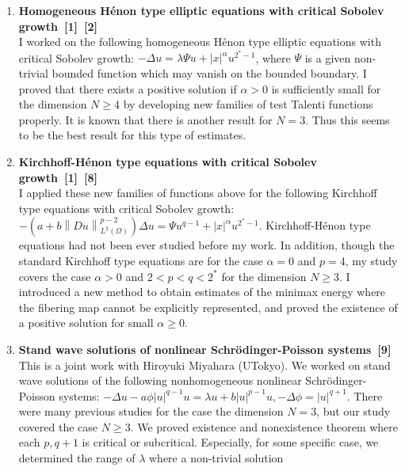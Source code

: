 
\begin{enumerate}
  \item {\bf Homogeneous H\'enon type elliptic equations with critical Sobolev growth~[1]~[2]} \\
  I worked on the following
  homogeneous H\'enon type elliptic equations with critical Sobolev growth:
  $- \Delta u = \lambda \Psi u + \lvert x \rvert^\alpha u^{2^*-1}$,
  where
  $\Psi$ is a given non-trivial bounded function which may vanish on the bounded boundary. I proved that there exists a positive solution if $\alpha > 0$ is sufficiently small for the dimension $N \geq 4$ by developing new families of test Talenti functions properly. It is known that there is another result for $N = 3$. Thus this seems to be the best result for this type of estimates.
  \item {\bf Kirchhoff-H\'enon type equations with critical Sobolev growth~[1]~[8]} \\
  I applied these new families of functions above for the following Kirchhoff type equations with critical Sobolev growth:
  $- \left( a + b \left\| Du \right\|^{p-2}_{L^2(\Omega)} \right) \Delta u = \Psi u^{q-1} + \lvert x \rvert^\alpha u^{2^* - 1}$.
  Kirchhoff-H\'enon type equations had not been ever studied before my work. In addition, though the standard Kirchhoff type equations are for the case $\alpha = 0$ and $p = 4$, my study covers the case $\alpha > 0$ and $2 < p < q < 2^*$ for the dimension $N \geq 3$. I introduced a new method to obtain estimates of the minimax energy where the fibering map cannot be explicitly represented, and proved the existence of a positive solution for small $\alpha \geq 0$.
  \item {\bf Stand wave solutions of
  nonlinear Schr\"{o}dinger-Poisson systems~[9]} \\
  This is a joint work with Hiroyuki Miyahara (UTokyo).
  We worked on stand wave solutions
  of the following nonhomogeneous
  nonlinear Schr\"{o}dinger-Poisson systems:
  $-\Delta u -a \phi \left\lvert u \right\rvert^{q-1} u = \lambda u
  + b \left\lvert u \right\rvert^{p-1} u, -\Delta \phi =
  \left\lvert u \right\rvert^{q+1}$.
  There were many previous studies for the case the dimension $N = 3$,
  but our study covered the case $N \geq 3$.
  We proved existence and nonexistence theorem
  where each $p, q+1$ is critical or subcritical.
  Especially, for some specific case,
  we determined the range of $\lambda$ where a non-trivial solution

\end{enumerate}

